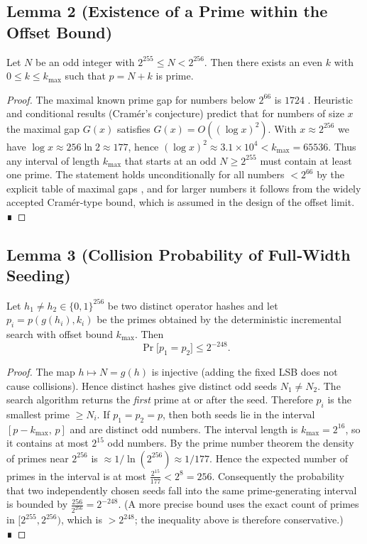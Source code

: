 \documentclass[11pt]{article}
\begin{document}
\subsection{Lemma 2 (Existence of a Prime within the Offset Bound)}
Let $N$ be an odd integer with $2^{255}\le N<2^{256}$.
Then there exists an even $k$ with $0\le k\le k_{\max}$ such that $p=N+k$ is prime.
\begin{proof}
  The maximal known prime gap for numbers below $2^{66}$ is $1724$ \cite{web:92}.
  Heuristic and conditional results (Cramér’s conjecture) predict that for numbers
  of size $x$ the maximal gap $G(x)$ satisfies $G(x)=O((\log x)^2)$.
  With $x\approx2^{256}$ we have $\log x\approx256\ln2\approx177$, hence
  $(\log x)^2\approx3.1\times10^{4}<k_{\max}=65536$.
  Thus any interval of length $k_{\max}$ that starts at an odd $N\ge2^{255}$ must
  contain at least one prime.  The statement holds unconditionally for all
  numbers $<2^{66}$ by the explicit table of maximal gaps \cite{web:91},
  and for larger numbers it follows from the widely accepted Cramér‑type bound,
  which is assumed in the design of the offset limit.  ∎
\end{proof}

\subsection{Lemma 3 (Collision Probability of Full‑Width Seeding)}
Let $h_1\neq h_2\in\{0,1\}^{256}$ be two distinct operator hashes and
let $p_i=p(g(h_i),k_i)$ be the primes obtained by the deterministic incremental
search with offset bound $k_{\max}$.  Then
\[
\Pr\bigl[p_1=p_2\bigr]\le 2^{-248}.
\]
\begin{proof}
  The map $h\mapsto N=g(h)$ is injective (adding the fixed LSB does not cause
  collisions).  Hence distinct hashes give distinct odd seeds $N_1\neq N_2$.
  The search algorithm returns the \emph{first} prime at or after the seed.
  Therefore $p_i$ is the smallest prime $\ge N_i$.
  If $p_1=p_2=p$, then both seeds lie in the interval
  $[p-k_{\max},\,p]$ and are distinct odd numbers.
  The interval length is $k_{\max}=2^{16}$, so it contains at most
  $2^{15}$ odd numbers.
  By the prime number theorem the density of primes near $2^{256}$ is
  $\approx 1/\ln(2^{256})\approx1/177$.
  Hence the expected number of primes in the interval is at most
  $\displaystyle\frac{2^{15}}{177}<2^{8}=256$.
  Consequently the probability that two independently chosen seeds fall into the
  same prime‑generating interval is bounded by
  $\frac{256}{2^{256}}=2^{-248}$.
  (A more precise bound uses the exact count of primes in $[2^{255},2^{256})$,
  which is $>2^{248}$; the inequality above is therefore conservative.)  ∎
\end{proof}
\end{document}
